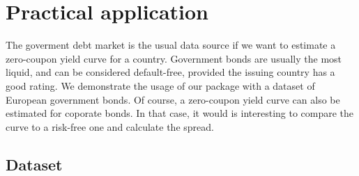 \newpage
\section{Practical application}
\label{sec:pract-appl}

The goverment debt market is the usual data source if we want to estimate a zero-coupon yield curve for a country. Government bonds are usually the most liquid, and can be considered default-free, provided the issuing country has a good rating. We demonstrate the usage of our package with a dataset of European government bonds. Of course, a zero-coupon yield curve can also be estimated for coporate bonds. In that case, it would is interesting to compare the curve to a risk-free one and calculate the spread.

\subsection{Dataset}



